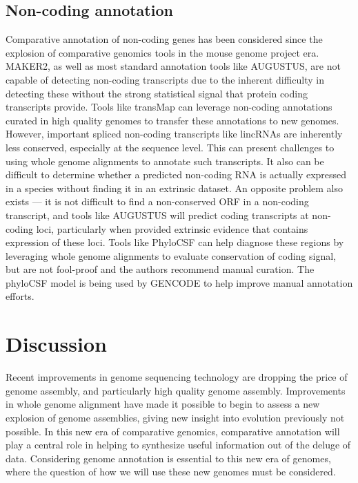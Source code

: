 \documentclass[fleqn,10pt]{wlscirep}
\begin{document}
\subsection{Non-coding annotation}
Comparative annotation of non-coding genes has been considered since the explosion of comparative genomics tools in the mouse genome project era\cite{rivas2001noncoding}. MAKER2, as well as most standard annotation tools like AUGUSTUS, are not capable of detecting non-coding transcripts due to the inherent difficulty in detecting these without the strong statistical signal that protein coding transcripts provide. Tools like transMap can leverage non-coding annotations curated in high quality genomes to transfer these annotations to new genomes. However, important spliced non-coding transcripts like lincRNAs are inherently less conserved, especially at the sequence level\cite{Lagarde105064,diederichs2014four,ulitsky2013lincrnas}. This can present challenges to using whole genome alignments to annotate such transcripts. It also can be difficult to determine whether a predicted non-coding RNA is actually expressed in a species without finding it in an extrinsic dataset. An opposite problem also exists --- it is not difficult to find a non-conserved ORF in a non-coding transcript, and tools like AUGUSTUS will predict coding transcripts at non-coding loci, particularly when provided extrinsic evidence that contains expression of these loci. Tools like PhyloCSF\cite{lin2011phylocsf} can help diagnose these regions by leveraging whole genome alignments to evaluate conservation of coding signal, but are not fool-proof and the authors recommend manual curation. The phyloCSF model is being used by GENCODE to help improve manual annotation efforts.

\section{Discussion}
Recent improvements in genome sequencing technology are dropping the price of genome assembly, and particularly high quality genome assembly. Improvements in whole genome alignment have made it possible to begin to assess a new explosion of genome assemblies, giving new insight into evolution previously not possible. In this new era of comparative genomics, comparative annotation will play a central role in helping to synthesize useful information out of the deluge of data. Considering genome annotation is essential to this new era of genomes, where the question of how we will use these new genomes must be considered. 
\end{document}
